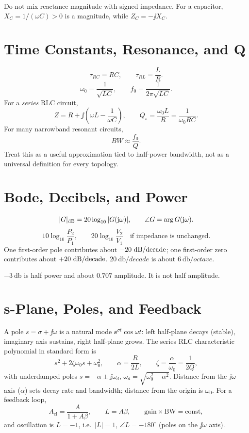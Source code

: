\begin{mistakebox}
Do not mix reactance magnitude with signed impedance. For a capacitor,
\(X_C=1/(\omega C)>0\) is a magnitude, while \(Z_C=-\jj X_C\).
\end{mistakebox}

\section{Time Constants, Resonance, and Q}
\[
\tau_{RC}=RC,\qquad \tau_{RL}=\frac{L}{R}.
\]
\[
\omega_0=\frac{1}{\sqrt{LC}},
\qquad
f_0=\frac{1}{2\pi\sqrt{LC}}.
\]
For a \emph{series} RLC circuit,
\[
Z=R+\jj\left(\omega L-\frac{1}{\omega C}\right),
\qquad
Q_s=\frac{\omega_0 L}{R}=\frac{1}{\omega_0 R C}.
\]
For many narrowband resonant circuits,
\[
BW\approx \frac{f_0}{Q}.
\]
Treat this as a useful approximation tied to half-power bandwidth, not as a
universal definition for every topology.

\section{Bode, Decibels, and Power}
\[
|G|_{\mathrm{dB}}=20\log_{10}|G(\mathrm{j}\omega)|,
\qquad
\angle G=\arg G(\mathrm{j}\omega).
\]
\[
10\log_{10}\frac{P_2}{P_1},\qquad
20\log_{10}\frac{V_2}{V_1}\quad \text{if impedance is unchanged.}
\]
One first-order pole contributes about \(-20~\mathrm{dB}/\mathrm{decade}\); one
first-order zero contributes about \(+20~\mathrm{dB}/\mathrm{decade}\).
\(\SI{20}{\decibel/decade}\) is about \(\SI{6}{\decibel/octave}\).

\begin{mistakebox}
\(-\SI{3}{\decibel}\) is half power and about \(0.707\) amplitude. It is not
half amplitude.
\end{mistakebox}

\section{s-Plane, Poles, and Feedback}
A pole \(s=\sigma+\jj\omega\) is a natural mode \(\ee^{\sigma t}\cos\omega t\):
left half-plane decays (stable), imaginary axis sustains, right half-plane grows.
The series RLC characteristic polynomial in standard form is
\[
s^2+2\zeta\omega_0 s+\omega_0^2,
\qquad
\alpha=\frac{R}{2L},
\qquad
\zeta=\frac{\alpha}{\omega_0}=\frac{1}{2Q},
\]
with underdamped poles \(s=-\alpha\pm\jj\omega_d\), \(\omega_d=\sqrt{\omega_0^2-\alpha^2}\).
Distance from the \(\jj\omega\) axis (\(\alpha\)) sets decay rate and bandwidth;
distance from the origin is \(\omega_0\). For a feedback loop,
\[
A_{\mathrm{cl}}=\frac{A}{1+A\beta},
\qquad
L=A\beta,
\qquad
\text{gain}\times\text{BW}=\text{const},
\]
and oscillation is \(L=-1\), i.e.\ \(|L|=1\), \(\angle L=-180^\circ\) (poles on the
\(\jj\omega\) axis).

